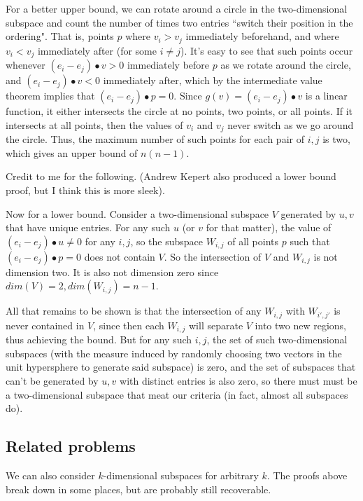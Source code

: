 For a better upper bound, we can rotate around a circle in the two-dimensional subspace and count the number of times two entries ``switch their position in the ordering". That is, points $p$ where $v_i>v_j$ immediately beforehand, and where $v_i<v_j$ immediately after (for some $i\neq j$). It's easy to see that such points occur whenever $(e_i-e_j)\bullet v>0$ immediately before $p$ as we rotate around the circle, and $(e_i-e_j)\bullet v<0$ immediately after, which by the intermediate value theorem implies that $(e_i-e_j)\bullet p=0$. Since $g(v)=(e_i-e_j)\bullet v$ is a linear function, it either intersects the circle at no points, two points, or all points. If it intersects at all points, then the values of $v_i$ and $v_j$ never switch as we go around the circle. Thus, the maximum number of such points for each pair of $i,j$ is two, which gives an upper bound of $n(n-1)$.

Credit to me for the following. (Andrew Kepert also produced a lower bound proof, but I think this is more sleek).

Now for a lower bound. Consider a two-dimensional subspace $V$ generated by $u,v$ that have unique entries. For any such $u$ (or $v$ for that matter), the value of $(e_i-e_j)\bullet u\neq 0$ for any $i,j$, so the subspace $W_{i,j}$ of all points $p$ such that $(e_i-e_j)\bullet p=0$ does not contain $V$. So the intersection of $V$ and $W_{i,j}$ is not dimension two. It is also not dimension zero since $dim(V)=2,dim(W_{i,j})=n-1$.

All that remains to be shown is that the intersection of any $W_{i,j}$ with $W_{i',j'}$ is never contained in $V$, since then each $W_{i,j}$ will separate $V$ into two new regions, thus achieving the bound. But for any such $i,j$, the set of such two-dimensional subspaces (with the measure induced by randomly choosing two vectors in the unit hypersphere to generate said subspace) is zero, and the set of subspaces that can't be generated by $u,v$ with distinct entries is also zero, so there must must be a two-dimensional subspace that meat our criteria (in fact, almost all subspaces do).

\subsection{Related problems}

We can also consider $k$-dimensional subspaces for arbitrary $k$. The proofs above break down in some places, but are probably still recoverable.


